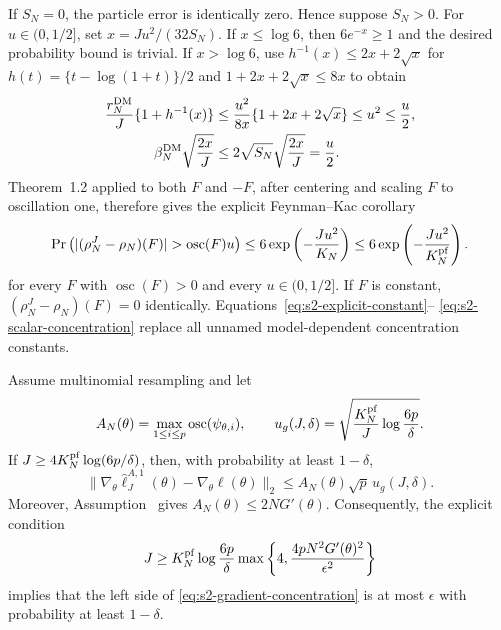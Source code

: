 If $S_N=0$, the particle error is identically zero.  Hence suppose $S_N>0$.
For $u\in(0,1/2]$, set $x=Ju^2/(32S_N)$.  If $x\leq\log6$, then
$6e^{-x}\geq1$ and the desired probability bound is trivial.  If
$x>\log6$, use
$h^{-1}(x)\leq2x+2\sqrt x$ for
$h(t)=\{t-\log(1+t)\}/2$ and
$1+2x+2\sqrt x\leq8x$ to obtain
\begin{align*}
\frac{r_N^{\rm DM}}J\{1+h^{-1}(x)\}
&\leq\frac{u^2}{8x}\{1+2x+2\sqrt x\}
 \leq u^2\leq\frac u2,\\
\beta_N^{\rm DM}\sqrt{\frac{2x}{J}}
&\leq2\sqrt{S_N}\sqrt{\frac{2x}{J}}=\frac u2.
\end{align*}
Theorem~1.2 applied to both $F$ and $-F$, after centering and scaling $F$ to
oscillation one, therefore gives the explicit Feynman--Kac corollary
\begin{equation}
\Pr\left(
 |(\rho_N^J-\rho_N)(F)|>\operatorname{osc}(F)u
 \right)
\leq6\exp\left(-\frac{Ju^2}{K_N}\right)
\leq6\exp\left(-\frac{Ju^2}{K_N^{\rm pf}}\right).             \label{eq:s2-scalar-concentration}
\end{equation}
for every $F$ with $\operatorname{osc}(F)>0$ and every $u\in(0,1/2]$.
If $F$ is constant, $(\rho_N^J-\rho_N)(F)=0$ identically.
Equations~\ref{eq:s2-explicit-constant}--
\ref{eq:s2-scalar-concentration} replace all unnamed model-dependent
concentration constants.

\begin{lem}[Explicit concentration of the \aigen{Algorithm~\ref{alg:dmop} ($\alpha=1$)} gradient]
\label{lemma:grad_bound}
Assume multinomial resampling and let
\begin{equation}
A_N(\theta)=\max_{1\leq i\leq p}
 \operatorname{osc}(\psi_{\theta,i}),
\qquad
u_g(J,\delta)=
 \sqrt{\frac{K_N^{\rm pf}}{J}\log\frac{6p}{\delta}}.
\label{eq:s2-gradient-constants}
\end{equation}
If $J\geq4K_N^{\rm pf}\log(6p/\delta)$, then, with probability at least
$1-\delta$,
\begin{equation}
\|\nabla_\theta\hat\ell_J^{A,1}(\theta)
      -\nabla_\theta\ell(\theta)\|_2
\leq A_N(\theta)\sqrt p\,u_g(J,\delta).                        \label{eq:s2-gradient-concentration}
\end{equation}
Moreover, Assumption~{} gives
$A_N(\theta)\leq2NG'(\theta)$.  Consequently, the explicit condition
\begin{equation}
J\geq K_N^{\rm pf}\log\frac{6p}{\delta}
 \max\left\{4,\frac{4pN^2G'(\theta)^2}{\epsilon^2}\right\}     \label{eq:s2-gradient-particle-count}
\end{equation}
implies that the left side of \eqref{eq:s2-gradient-concentration} is at most
$\epsilon$ with probability at least $1-\delta$.
\end{lem}

